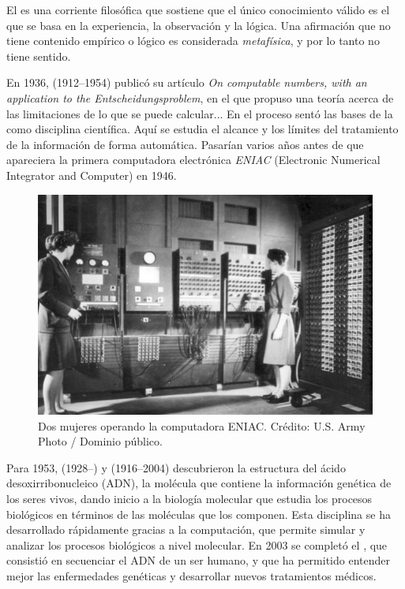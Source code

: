 \begin{remember}
    \label{rem:empirismo lógico}
    El  es una corriente
    filosófica que sostiene que el único conocimiento válido es el que se basa
    en la experiencia, la observación y la lógica.
    Una afirmación que no tiene contenido empírico o lógico es considerada
    \emph{metafísica}, y por lo tanto no tiene sentido.
\end{remember}

En 1936,  (1912--1954) publicó su artículo
\emph{On computable numbers, with an application to the Entscheidungsproblem},
en el que propuso una teoría acerca de las limitaciones de lo que se puede
calcular... En el proceso sentó las bases de la 
como disciplina científica.
Aquí se estudia el alcance y los límites del tratamiento de la información de
forma automática.
Pasarían varios años antes de que apareciera la primera computadora electrónica
\emph{ENIAC} (Electronic Numerical Integrator and Computer) en 1946.

\begin{figure}[ht]
    \centering
    \includegraphics[width=0.8\linewidth]{img/Two_women_operating_ENIAC}
    \caption{Dos mujeres operando la computadora ENIAC.
        Crédito: U.S. Army Photo / Dominio público.
    }
\end{figure}

Para 1953,  (1928--) y
 (1916--2004) descubrieron la estructura
del ácido desoxirribonucleico (ADN), la molécula que contiene la información
genética de los seres vivos, dando inicio a la %
{biología molecular} que estudia los procesos biológicos en términos de las
moléculas que los componen.
Esta disciplina se ha desarrollado rápidamente gracias a la computación, que
permite simular y analizar los procesos biológicos a nivel molecular.
En 2003 se completó el ,
que consistió en secuenciar el ADN de un ser humano, y que ha permitido
entender mejor las enfermedades genéticas y desarrollar nuevos tratamientos
médicos.


